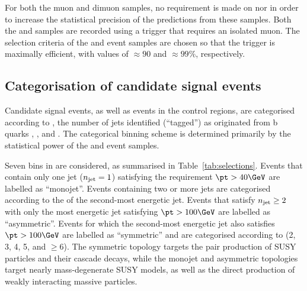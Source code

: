 For both the muon and dimuon samples, no requirement is made on
\alphat nor \bdphi in order to increase the statistical precision of
the predictions from these samples. Both the \mj and \mmj samples are
recorded using a trigger that requires an isolated muon. The selection
criteria of the \mj and \mmj event samples are chosen so that the
trigger is maximally efficient, with values of ${\approx}90$ and
${\approx}99\%$, respectively.


\subsection{Categorisation of candidate signal events}
\label{sec:categorisation}

Candidate signal events, as well as events in the control regions, are
categorised according to \njet, the number of jets identified
(``tagged'') as originated from b quarks \nb, \scalht, and \mht. The
categorical binning scheme is determined primarily by the statistical
power of the \mj and \mmj event samples.

Seven bins in \njet are considered, as summarised in
Table~\ref{tab:selections}. Events that contain only one jet ($n_{\text{jet}} =
1$) satisfying the requirement $\pt > 40\GeV$ are labelled as
``monojet''. Events containing two or more jets are categorised
according to the \pt of the second-most energetic jet. Events that
satisfy $n_{\text{jet}} \geq 2$ with only the most energetic jet satisfying
$\pt > 100\GeV$ are labelled as ``asymmetric''. Events for which the
second-most energetic jet also satisfies $\pt > 100\GeV$ are labelled
as ``symmetric'' and are categorised according to \njet (2, 3, 4, 5,
and $\geq$6). The symmetric topology targets the pair production of
SUSY particles and their cascade decays, while the monojet and
asymmetric topologies target nearly mass-degenerate SUSY models, as
well as the direct production of weakly interacting massive particles.

